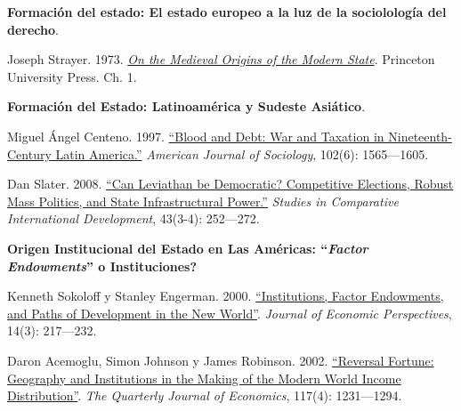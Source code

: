 \documentclass[letterpaper]{article}
\renewenvironment{itemize}{
  \begin{list}{}{
    \setlength{\leftmargin}{1.5em}
  }
}{
  \end{list}
}
\begin{document}
\begin{enumerate}[label=\roman*.]
\begin{itemize}
			\item[3.] {\bf Formaci\'on del estado: El estado europeo a la luz de la sociololog\'ia del derecho}.
				\begin{itemize} 
					\item[$\circ$] Joseph Strayer. 1973. \href{https://github.com/hbahamonde/Ciencia_Politica_II/raw/master/Readings/Strayer.pdf}{\emph{On the Medieval Origins of the Modern State}}. Princeton University Press. Ch. 1.
				\end{itemize}

			\item[4.] {\bf Formaci\'on del Estado: Latinoam\'erica y Sudeste Asi\'atico}.
				\begin{itemize}
					\item[$\circ$] Miguel \'Angel Centeno. 1997. \href{https://github.com/hbahamonde/Ciencia_Politica_II/raw/master/Readings/Centeno.pdf}{``Blood and Debt: War and Taxation in Nineteenth-Century Latin America.''} \emph{American Journal of Sociology}, 102(6): 1565---1605. 
					
					\item[$\circ$] Dan Slater. 2008. \href{https://github.com/hbahamonde/Ciencia_Politica_II/raw/master/Readings/Slater.pdf}{``Can Leviathan be Democratic? Competitive Elections, Robust Mass Politics, and State Infrastructural Power.''} \emph{Studies in Comparative International Development}, 43(3-4): 252---272.
				\end{itemize}

		\item[5.] {\bf Origen Institucional del Estado en Las Am\'ericas: ``\emph{Factor Endowments}'' o Instituciones?}
				\begin{itemize}
					\item[$\circ$] Kenneth Sokoloff y Stanley Engerman. 2000. \href{https://github.com/hbahamonde/Ciencia_Politica_II/raw/master/Readings/Sokoloff_Engerman.pdf}{``Institutions, Factor Endowments, and Paths of Development in the New World''}. \emph{Journal of Economic Perspectives}, 14(3): 217---232. 
					\item[$\circ$] Daron Acemoglu, Simon Johnson y James Robinson. 2002. \href{https://github.com/hbahamonde/Ciencia_Politica_II/raw/master/Readings/Reversal_of_fortune.pdf}{``Reversal Fortune: Geography and Institutions in the Making of the Modern World Income Distribution''}. \emph{The Quarterly Journal of Economics}, 117(4): 1231---1294. 
				\end{itemize}



\end{itemize}
\end{enumerate}
\end{document}
